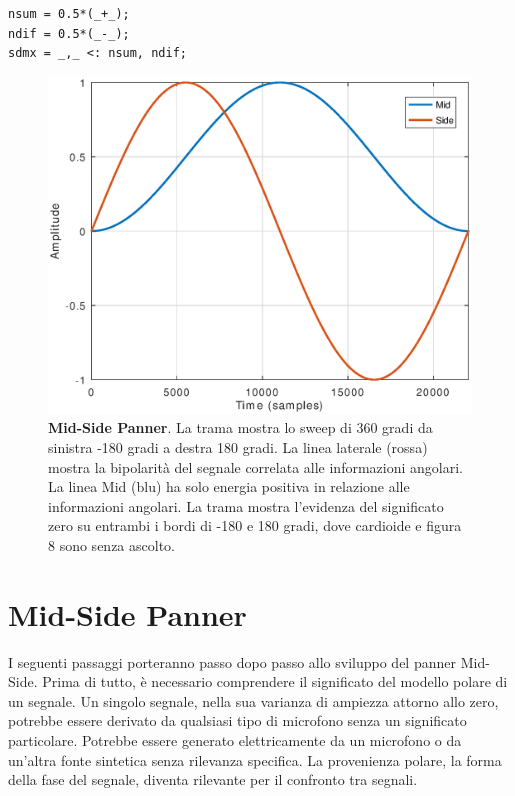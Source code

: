 \begin{lstlisting}
nsum = 0.5*(_+_);
ndif = 0.5*(_-_);
sdmx = _,_ <: nsum, ndif;
\end{lstlisting}

\vfill

\begin{figure}[h]
\centering
\includegraphics[width=1\columnwidth]{CAPITOLI/1000/IMG/mspan}
\caption{\textbf{Mid-Side Panner}. La trama mostra lo sweep di 360 gradi da
sinistra -180 gradi a destra 180 gradi. La linea laterale (rossa) mostra la
bipolarità del segnale correlata alle informazioni angolari. La linea Mid (blu)
ha solo energia positiva in relazione alle informazioni angolari. La trama
mostra l'evidenza del significato zero su entrambi i bordi di -180 e 180 gradi,
dove cardioide e figura 8 sono senza ascolto.}
\label{fig:mspan}
\end{figure}

\section{Mid-Side Panner}
\label{sec:mspanner}

I seguenti passaggi porteranno passo dopo passo allo sviluppo del panner
Mid-Side. Prima di tutto, è necessario comprendere il significato del modello
polare di un segnale. Un singolo segnale, nella sua varianza di ampiezza attorno
allo zero, potrebbe essere derivato da qualsiasi tipo di microfono senza un
significato particolare. Potrebbe essere generato elettricamente da un microfono
o da un'altra fonte sintetica senza rilevanza specifica. La provenienza polare,
la forma della fase del segnale, diventa rilevante per il confronto tra segnali.

